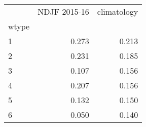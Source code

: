 \begin{tabular}{lrr}
\toprule
{} &  NDJF 2015-16 &  climatology \\
wtype &               &              \\
\midrule
1     &         0.273 &        0.213 \\
2     &         0.231 &        0.185 \\
3     &         0.107 &        0.156 \\
4     &         0.207 &        0.156 \\
5     &         0.132 &        0.150 \\
6     &         0.050 &        0.140 \\
\bottomrule
\end{tabular}
